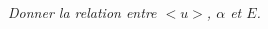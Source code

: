 \documentclass[10pt,fleqn]{article} %
\begin{document}
\begin{multicols}{2}
\begin{multicols}{2}
\subparagraph{}\textit{Donner la relation entre $< u >$, $\alpha$ et $E$.}


\ifprof
\end{multicols}
\else
\end{multicols}
\fi
\end{document}
